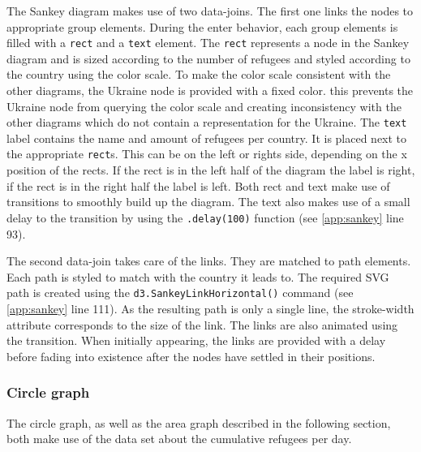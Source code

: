 The Sankey diagram makes use of two data-joins. The first one links the nodes to appropriate group elements. During the enter behavior, each group elements is filled with a \texttt{rect} and a \texttt{text} element. The \texttt{rect} represents a node in the Sankey diagram and is sized according to the number of refugees and styled according to the country using the color scale. To make the color scale consistent with the other diagrams, the Ukraine node is provided with a fixed color. this prevents the Ukraine node from querying the color scale and creating inconsistency with the other diagrams which do not contain a representation for the Ukraine. The \texttt{text} label contains the name and amount of refugees per country. It is placed next to the appropriate \texttt{rect}s. This can be on the left or rights side, depending on the x position of the rects. If the rect is in the left half of the diagram the label is right, if the rect is in the right half the label is left. Both rect and text make use of transitions to smoothly build up the diagram. The text also makes use of a small delay to the transition by using the \texttt{.delay(100)} function (see \ref{app:sankey} line 93).

The second data-join takes care of the links. They are matched to path elements. Each path is styled to match with the country it leads to. The required SVG path is created using the \texttt{d3.SankeyLinkHorizontal()} command (see \ref{app:sankey} line 111). As the resulting path is only a single line, the stroke-width attribute corresponds to the size of the link. The links are also animated using the transition. When initially appearing, the links are provided with a delay before fading into existence after the nodes have settled in their positions.

\subsubsection{Circle graph}
The circle graph, as well as the area graph described in the following section, both make use of the data set about the cumulative refugees per day.

